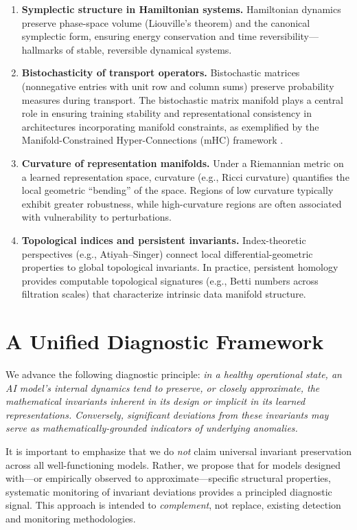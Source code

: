 \documentclass[11pt]{article}
\begin{document}
\begin{enumerate}
  \item \textbf{Symplectic structure in Hamiltonian systems.}
  Hamiltonian dynamics preserve phase-space volume (Liouville's theorem) and the canonical symplectic form, ensuring energy conservation and time reversibility---hallmarks of stable, reversible dynamical systems.

  \item \textbf{Bistochasticity of transport operators.}
  Bistochastic matrices (nonnegative entries with unit row and column sums) preserve probability measures during transport. The bistochastic matrix manifold plays a central role in ensuring training stability and representational consistency in architectures incorporating manifold constraints, as exemplified by the Manifold-Constrained Hyper-Connections (mHC) framework \cite{deepseek2025mhc}.

  \item \textbf{Curvature of representation manifolds.}
  Under a Riemannian metric on a learned representation space, curvature (e.g., Ricci curvature) quantifies the local geometric ``bending'' of the space. Regions of low curvature typically exhibit greater robustness, while high-curvature regions are often associated with vulnerability to perturbations.

  \item \textbf{Topological indices and persistent invariants.}
  Index-theoretic perspectives (e.g., Atiyah--Singer) connect local differential-geometric properties to global topological invariants. In practice, persistent homology provides computable topological signatures (e.g., Betti numbers across filtration scales) that characterize intrinsic data manifold structure.
\end{enumerate}

\section{A Unified Diagnostic Framework}

We advance the following diagnostic principle: \emph{in a healthy operational state, an AI model's internal dynamics tend to preserve, or closely approximate, the mathematical invariants inherent in its design or implicit in its learned representations. Conversely, significant deviations from these invariants may serve as mathematically-grounded indicators of underlying anomalies.}

It is important to emphasize that we do \emph{not} claim universal invariant preservation across all well-functioning models. Rather, we propose that for models designed with---or empirically observed to approximate---specific structural properties, systematic monitoring of invariant deviations provides a principled diagnostic signal. This approach is intended to \emph{complement}, not replace, existing detection and monitoring methodologies.
\end{document}
